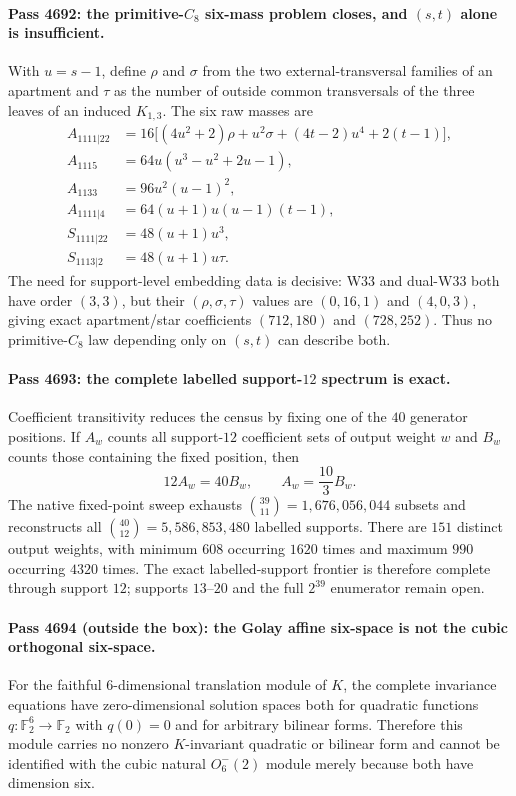 \paragraph{Pass 4692: the primitive-$C_8$ six-mass problem closes, and $(s,t)$ alone is insufficient.}
With $u=s-1$, define $\rho$ and $\sigma$ from the two external-transversal families of an apartment and $\tau$ as the number of outside common transversals of the three leaves of an induced $K_{1,3}$.  The six raw masses are
\[
\begin{aligned}
 A_{1111|22}&=16\bigl[(4u^2+2)\rho+u^2\sigma+(4t-2)u^4+2(t-1)\bigr],\\
 A_{1115}&=64u(u^3-u^2+2u-1),\\
 A_{1133}&=96u^2(u-1)^2,\\
 A_{1111|4}&=64(u+1)u(u-1)(t-1),\\
 S_{1111|22}&=48(u+1)u^3,\\
 S_{1113|2}&=48(u+1)u\tau.
\end{aligned}
\]
The need for support-level embedding data is decisive: W33 and dual-W33 both have order $(3,3)$, but their $(\rho,\sigma,\tau)$ values are $(0,16,1)$ and $(4,0,3)$, giving exact apartment/star coefficients $(712,180)$ and $(728,252)$.  Thus no primitive-$C_8$ law depending only on $(s,t)$ can describe both.

\paragraph{Pass 4693: the complete labelled support-$12$ spectrum is exact.}
Coefficient transitivity reduces the census by fixing one of the $40$ generator positions.  If $A_w$ counts all support-$12$ coefficient sets of output weight $w$ and $B_w$ counts those containing the fixed position, then
\[
 12A_w=40B_w,\qquad A_w=\frac{10}{3}B_w.
\]
The native fixed-point sweep exhausts $\binom{39}{11}=1{,}676{,}056{,}044$ subsets and reconstructs all $\binom{40}{12}=5{,}586{,}853{,}480$ labelled supports.  There are $151$ distinct output weights, with minimum $608$ occurring $1620$ times and maximum $990$ occurring $4320$ times.  The exact labelled-support frontier is therefore complete through support $12$; supports $13$--$20$ and the full $2^{39}$ enumerator remain open.

\paragraph{Pass 4694 (outside the box): the Golay affine six-space is not the cubic orthogonal six-space.}
For the faithful $6$-dimensional translation module of $K$, the complete invariance equations have zero-dimensional solution spaces both for quadratic functions $q:\mathbb F_2^6\to\mathbb F_2$ with $q(0)=0$ and for arbitrary bilinear forms.  Therefore this module carries no nonzero $K$-invariant quadratic or bilinear form and cannot be identified with the cubic natural $O^-_6(2)$ module merely because both have dimension six.


